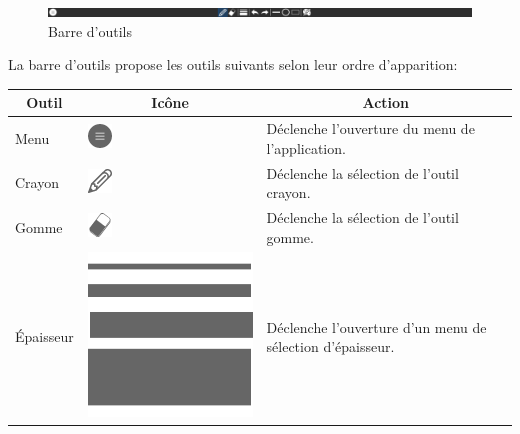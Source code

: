 \documentclass[11pt,a4paper,oldfontcommands]{memoir}
\begin{document}
\begin{figure}[h]
\centering
\includegraphics[scale=0.4]{images/toolbar.png}
\caption{Barre d'outils}
\end{figure}

La barre d'outils propose les outils suivants selon leur ordre d'apparition:

\begin{table}[h]
\centering
\begin{tabular}{|l|l|l|}
\hline
\multicolumn{1}{|c|}{\textbf{Outil}} & \multicolumn{1}{c|}{\textbf{Icône}} & \multicolumn{1}{c|}{\textbf{Action}} \\ \hline
Menu                                 & \includegraphics{images/icon-menu.png}                                    & Déclenche l'ouverture du menu de l'application.                                                    \\ \hline
Crayon                               & \includegraphics{images/icon-pen.png}                                     & Déclenche la sélection de l'outil crayon.                                                         \\ \hline
Gomme                                & \includegraphics{images/icon-eraser.png}                                     & Déclenche la sélection de l'outil gomme.                                                          \\ \hline
Épaisseur                            & \includegraphics[scale=0.13]{images/icon-thickness.png}                                     & Déclenche l'ouverture d'un menu de sélection d'épaisseur.                                        \\ \hline

\end{tabular}
\end{table}
\end{document}
